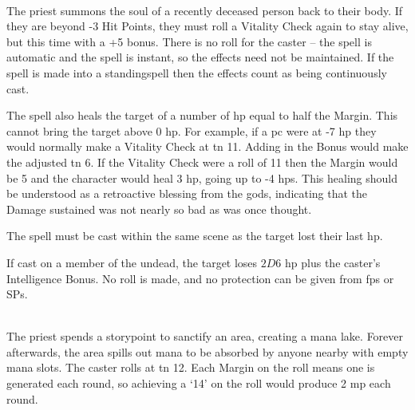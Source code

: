 \begin{multicols}{2}
\\
The priest summons the soul of a recently deceased person back to their body.
If they are beyond -3 Hit Points, they must roll a Vitality Check again to stay alive, but this time with a +5 bonus.
There is no roll for the caster -- the spell is automatic and the spell is instant, so the effects need not be maintained.
If the spell is made into a \gls{standingspell} then the effects count as being continuously cast.

The spell also heals the target of a number of \gls{hp} equal to half the Margin.
This cannot bring the target above 0 \gls{hp}.
For example, if a \gls{pc} were at -7 \gls{hp} they would normally make a Vitality Check at \gls{tn} 11.
Adding in the Bonus would make the adjusted \gls{tn} 6.
If the Vitality Check were a roll of 11 then the Margin would be 5 and the character would heal 3 \gls{hp}, going up to -4 \glspl{hp}.
This healing should be understood as a retroactive blessing from the gods, indicating that the Damage sustained was not nearly so bad as was once thought.

The spell must be cast within the same scene as the target lost their last \gls{hp}.

If cast on a member of the undead, the target loses $2D6$ \gls{hp} plus the caster's Intelligence Bonus.
No roll is made, and no protection can be given from \glspl{fp} or \glspl{SP}.

\\
The priest spends a \gls{storypoint} to sanctify an area, creating a mana lake.
Forever afterwards, the area spills out mana to be absorbed by anyone nearby with empty mana slots.
The caster rolls at \gls{tn} 12.
Each Margin on the roll means one  is generated each round, so achieving a `14' on the roll would produce 2 \gls{mp} each round.

\end{multicols}


